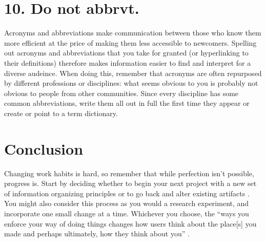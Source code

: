 \documentclass[10pt,letterpaper]{article}
\newcommand{\rulemajor}[1]{\section*{#1}}
\begin{document}
\rulemajor{10. Do not abbrvt.}

Acronyms and abbreviations make communication between those who know them more
efficient at the price of making them less accessible to newcomers. Spelling
out acronyms and abbreviations that you take for granted (or hyperlinking to
their definitions) therefore makes information easier to find and interpret for 
a diverse audeince. When doing this, remember that acronyms are often repurposed by
different professions or disciplines: what seems obvious to you is probably not
obvious to people from other communities. Since every discipline has some common
abbreviations, write them all out in full the first time they appear or create
or point to a term dictionary.

\section*{Conclusion}

Changing work habits is hard, so remember that while perfection isn't possible,
progress is. Start by deciding whether to begin your next project with a new set
of information organizing principles or to go back and alter existing artifacts
\cite{Briney2015}. You might also consider this process as you would a research 
experiment, and incorporate one small change at a time. Whichever you choose, the
``ways you enforce your way of doing things changes how users think about the 
place[s] you made and perhaps ultimately, how they think about you'' \cite{Covert2014}.


\end{document}
